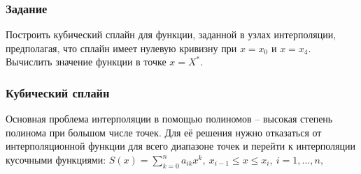 \documentclass[a4paper,12pt]{article}
\begin{document}
\subsubsection{Задание}
Построить кубический сплайн для функции, заданной в узлах интерполяции,
предполагая, что сплайн имеет нулевую кривизну при $x = x_0$ и $x = x_4$.
Вычислить значение функции в точке $x = X^{*}$.

\subsubsection{Кубический сплайн}
Основная проблема интерполяции в помощью полиномов --
высокая степень полинома при большом числе точек. Для её решения
нужно отказаться от интерполяционной функции для всего диапазоне точек
и перейти к интерполяции кусочными функциями:
$S(x) = \sum_{k = 0}^{n} a_{ik} x^{k},\ x_{i - 1} \leq x \leq x_i,\ i = 1,\ldots, n,$
\end{document}
